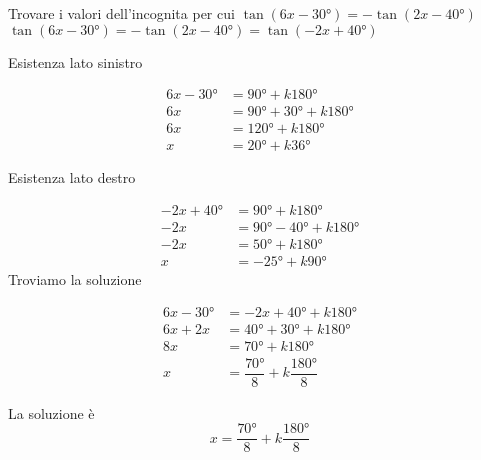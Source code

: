 \begin{exercise}
	Trovare i valori dell'incognita per cui $\tan(6x-\ang{30;;})=-\tan(2x-\ang{40;;})$
	\tcblower
	 $\tan(6x-\ang{30;;})=-\tan(2x-\ang{40;;})=\tan(-2x+\ang{40;;})$
	
	Esistenza lato sinistro
	
	\begin{align*}
		6x-\ang{30;;}&=\ang{90;;}+k\ang{180;;}\\
		6x&=\ang{90;;}+\ang{30;;}+k\ang{180;;}\\
		6x&=\ang{120;;}+k\ang{180;;}\\
		x&=\ang{20;;}+k\ang{36;;}
		\end{align*}
	
	Esistenza lato destro
	
	\begin{align*}
		-2x+\ang{40;;}&=\ang{90;;}+k\ang{180;;}\\
		-2x&=\ang{90;;}-\ang{40;;}+k\ang{180;;}\\
		-2x&=\ang{50;;}+k\ang{180;;}\\
		x&=-\ang{25;;}+k\ang{90;;}
		\end{align*}
	Troviamo la soluzione
	
		\begin{align*}
		6x-\ang{30;;}&=-2x+\ang{40;;}+k\ang{180;;}\\
		6x+2x&=\ang{40;;}+\ang{30;;}+k\ang{180;;}\\
		8x&=\ang{70;;}+k\ang{180;;}\\
		x&=\dfrac{\ang{70;;}}{8}+k\dfrac{\ang{180;;}}{8}
		\end{align*}
	
	La soluzione è
	\[x=\dfrac{\ang{70;;}}{8}+k\dfrac{\ang{180;;}}{8}\]
\end{exercise}

